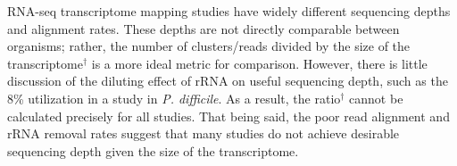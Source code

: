 \begin{table}
\begin{center}
\end{center}
\caption{Study Comparison: Poor Data Utilization Rates}\label{table:study_compare}
\small
RNA-seq transcriptome mapping studies have widely different sequencing depths and alignment rates. These depths are not directly comparable between organisms; rather, the number of clusters/reads divided by the size of the transcriptome$^{\dagger}$ is a more ideal metric for comparison. However, there is little discussion of the diluting effect of rRNA on useful sequencing depth, such as the 8\% utilization in a study in \textit{P. difficile}.\cite{115} As a result, the ratio$^{\dagger}$ cannot be calculated precisely for all studies. That being said, the poor read alignment and rRNA removal rates suggest that many studies do not achieve desirable sequencing depth given the size of the transcriptome.
\end{table}



